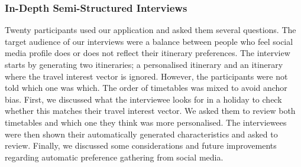 
\subsubsection{In-Depth Semi-Structured Interviews}
Twenty participants used our application and asked them several questions. The
target audience of our interviews were a balance between people who feel social
media profile does or does not reflect their itinerary preferences.  The
interview starts by generating two itineraries; a  personalised itinerary
and an itinerary where the travel interest vector is ignored.  However, the
participants were not told which one was which. The order of timetables was
mixed to avoid anchor bias. First, we discussed what the interviewee looks for in a
holiday to check whether this matches their travel interest vector.  We asked
them to review both timetables and which one they think was more personalised.
The interviewees were then shown their automatically generated characteristics
and asked to review.  Finally, we discussed some considerations and future
improvements regarding automatic preference gathering from social media.
